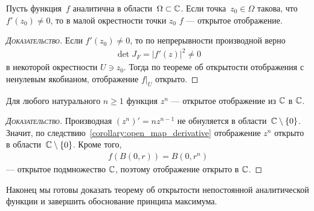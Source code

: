 \documentclass[../complex-analysis.tex]{subfiles}
\begin{document}
 \begin{crly}
  \label{corollary:open_map_derivative}
  Пусть функция~$ f $ аналитична в области~$ \Omega \subset \mathbb{C} $. Если точка~$ z_0 \in \Omega $ такова, что $ f'(z_0) \neq 0 $, то в малой окрестности точки $ z_0 $ $ f $ --- открытое отображение.
 \end{crly}
 \begin{proof}[\normalfont\textsc{Доказательство}]
  Если $ f'(z_0) \neq 0 $, то по непрерывности производной верно
  \begin{align*}
   \det J_F =  \left| f'(z) \right|^{2} \neq 0
  \end{align*} в некоторой окрестности $ U \ni z_0 $. Тогда по теореме об открытости отображения с ненулевым якобианом, отображение $ \left.f\right|_U $ открыто.
  \end{proof}

  \begin{lm}
   \label{lemma:open_map_z_n}
   Для любого натурального $ n \geqslant 1 $ функция $ z^{n} $ --- открытое отображение из $ \mathbb{C} $ в $ \mathbb{C} $.
  \end{lm}
  \begin{proof}[\normalfont\textsc{Доказательство}]
   Производная $(z^{n})' = nz^{n-1} $  не обнуляется в области~$ \mathbb{C} \setminus \left\{ 0 \right\} $. Значит, по следствию~\ref{corollary:open_map_derivative} отображение $ z^{n} $ открыто в области~$ \mathbb{C}\setminus \left\{ 0 \right\} $. Кроме того,
   \begin{align*}
    f(B(0,r)) = B(0,r^{n})
   \end{align*} --- открытое подмножество $ \mathbb{C} $, поэтому отображение открыто в $ \mathbb{C} $.
  \end{proof}

  Наконец мы готовы доказать теорему об открытости непостоянной аналитической функции и завершить обоснование принципа максимума.
\end{document}

